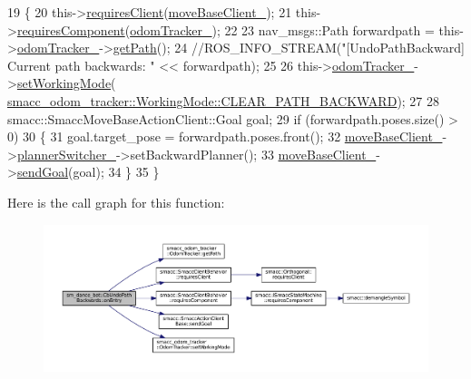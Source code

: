 \begin{DoxyCode}
19   \{
20     this->\hyperlink{classsmacc_1_1SmaccClientBehavior_adc21bbd45d36bd81ca6f778ed161807a}{requiresClient}(\hyperlink{classsm__dance__bot_1_1CbUndoPathBackwards_ae4f1221bbc5eabbaf86b00e61c7bca1b}{moveBaseClient\_});
21     this->\hyperlink{classsmacc_1_1SmaccClientBehavior_a011246bb1424f8bf8c9322f652db9d88}{requiresComponent}(\hyperlink{classsm__dance__bot_1_1CbUndoPathBackwards_a51cc8ec7a7e9da1f3cb4c1816b382af9}{odomTracker\_});
22 
23     nav\_msgs::Path forwardpath = this->\hyperlink{classsm__dance__bot_1_1CbUndoPathBackwards_a51cc8ec7a7e9da1f3cb4c1816b382af9}{odomTracker\_}->\hyperlink{classsmacc__odom__tracker_1_1OdomTracker_ace0762f93bc272a426d3038f74dc8752}{getPath}();
24     \textcolor{comment}{//ROS\_INFO\_STREAM("[UndoPathBackward] Current path backwards: " << forwardpath);}
25 
26     this->\hyperlink{classsm__dance__bot_1_1CbUndoPathBackwards_a51cc8ec7a7e9da1f3cb4c1816b382af9}{odomTracker\_}->\hyperlink{classsmacc__odom__tracker_1_1OdomTracker_a38fbca999297c46dc95628cc60851a45}{setWorkingMode}(
      \hyperlink{namespacesmacc__odom__tracker_ade9730dd5cc10ccfad9362176cf46c33a0cf8f27617189e35619df3c18bda6274}{smacc\_odom\_tracker::WorkingMode::CLEAR\_PATH\_BACKWARD});
27 
28     smacc::SmaccMoveBaseActionClient::Goal goal;
29     \textcolor{keywordflow}{if} (forwardpath.poses.size() > 0)
30     \{
31       goal.target\_pose = forwardpath.poses.front();
32       \hyperlink{classsm__dance__bot_1_1CbUndoPathBackwards_ae4f1221bbc5eabbaf86b00e61c7bca1b}{moveBaseClient\_}->\hyperlink{classsmacc_1_1SmaccMoveBaseActionClient_ae24164268108abf0b35cf51bfba5ec67}{plannerSwitcher\_}->setBackwardPlanner();
33       \hyperlink{classsm__dance__bot_1_1CbUndoPathBackwards_ae4f1221bbc5eabbaf86b00e61c7bca1b}{moveBaseClient\_}->\hyperlink{classsmacc_1_1SmaccActionClientBase_a58c67a87c5fb8ea1633573c58fe3eee1}{sendGoal}(goal);
34     \}
35   \}
\end{DoxyCode}


Here is the call graph for this function\+:
\nopagebreak
\begin{figure}[H]
\begin{center}
\leavevmode
\includegraphics[width=350pt]{classsm__dance__bot_1_1CbUndoPathBackwards_a5ecdf83df96ab3d74eb4e4febea7fa74_cgraph}
\end{center}
\end{figure}




